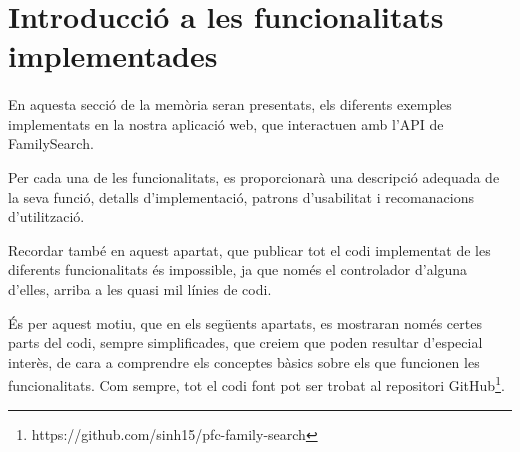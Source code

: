 \section{Introducció a les funcionalitats implementades}

    \paragraph{}
    En aquesta secció de la memòria seran presentats, els diferents exemples implementats en la nostra aplicació web, que interactuen amb l'API de FamilySearch.

    Per cada una de les funcionalitats, es proporcionarà una descripció adequada de la seva funció, detalls d'implementació, patrons d'usabilitat i recomanacions d'utilització.

    Recordar també en aquest apartat, que publicar tot el codi implementat de les diferents funcionalitats és impossible, ja que només el controlador d'alguna d'elles, arriba a les quasi mil línies de codi.

    És per aquest motiu, que en els següents apartats, es mostraran només certes parts del codi, sempre simplificades, que creiem que poden resultar d'especial interès, de cara a comprendre els conceptes bàsics sobre els que funcionen les funcionalitats. Com sempre, tot el codi font pot ser trobat al repositori GitHub\footnote{https://github.com/sinh15/pfc-family-search}.
